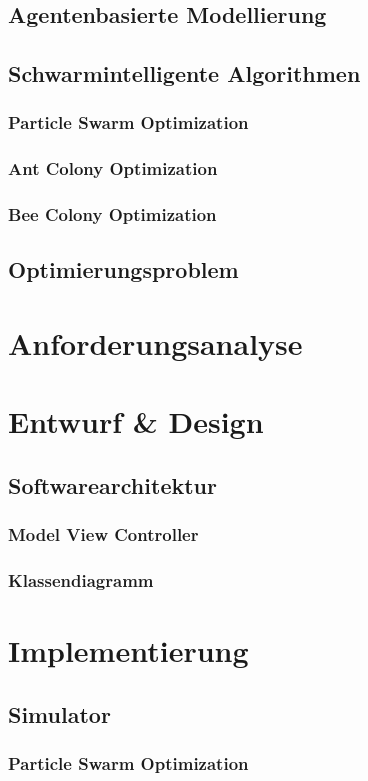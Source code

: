 \documentclass[a4paper, 11pt]{article}
\begin{document}
\subsection{Agentenbasierte Modellierung}
\subsection{Schwarmintelligente Algorithmen}
\subsubsection{Particle Swarm Optimization}
\subsubsection{Ant Colony Optimization}
\subsubsection{Bee Colony Optimization}
\subsection{Optimierungsproblem}
\section{Anforderungsanalyse}
\section{Entwurf \& Design}
\subsection{Softwarearchitektur}
\subsubsection{Model View Controller}
\subsubsection{Klassendiagramm}
\section{Implementierung}
\subsection{Simulator}
\subsubsection{Particle Swarm Optimization}
\end{document}
